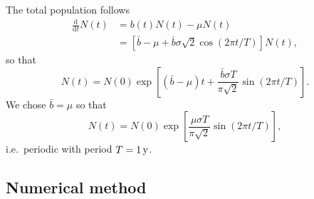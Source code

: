 \documentclass[USenglish]{article}
\newcommand{\md}{\mathrm{d}}
\begin{document}
The total population follows
\begin{equation}
  \label{model_unstructured_total}
  \begin{split}
    \frac{\md}{\md t} N(t)
    &= b(t) N(t) - \mu N(t)
    \\
    &= \left[
      \bar{b} - \mu
      + \bar{b} \sigma \sqrt{2} \cos\left(2 \pi t / T\right)
    \right]
    N(t),
  \end{split}
\end{equation}
so that
\begin{equation}
  N(t) = N(0) \exp\left[
    \left(\bar{b} - \mu\right) t
    + \frac{\bar{b} \sigma T}{\pi \sqrt{2}}
    \sin\left(2 \pi t / T\right)
  \right].
\end{equation}
We chose $\bar{b} = \mu$ so that
\begin{equation}
  N(t) = N(0) \exp\left[
    \frac{\mu \sigma T}{\pi \sqrt{2}}
    \sin\left(2 \pi t / T\right)
  \right],
\end{equation}
i.e.~periodic with period $T = \unit[1]{y}$.


\subsection{Numerical method}
\end{document}
